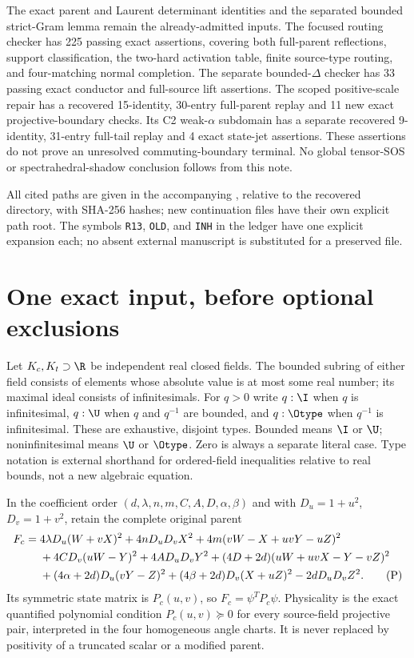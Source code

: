 The exact parent and Laurent determinant identities and the separated
bounded strict-Gram lemma remain the already-admitted inputs. The
focused routing checker has 225 passing exact assertions, covering both full-parent
reflections, support
classification, the two-hard activation table, finite source-type
routing, and four-matching normal completion. The separate bounded-$\Delta$
checker has 33 passing exact conductor and full-source lift assertions.
The scoped positive-scale repair has a recovered 15-identity, 30-entry
full-parent replay and 11 new exact projective-boundary checks.
Its C2 weak-$\alpha$ subdomain has a separate recovered 9-identity,
31-entry full-tail replay and 4 exact state-jet assertions.
These assertions do not
prove an unresolved commuting-boundary terminal. No global tensor-SOS
or spectrahedral-shadow conclusion follows from this note.

All cited paths are given in the accompanying ,
relative to the recovered  directory, with
SHA-256 hashes; new continuation files have their own explicit path root.
The symbols \texttt{R13}, \texttt{OLD}, and \texttt{INH}
in the ledger have one explicit expansion each; no absent external
manuscript is substituted for a preserved file.

\section{One exact input, before optional exclusions}

Let $K_c,K_t\supset\R$ be independent real closed fields. The bounded
subring of either field consists of elements whose absolute value is
at most some real number; its maximal ideal consists of infinitesimals.
For $q>0$ write $q:\I$ when $q$ is infinitesimal, $q:\U$ when $q$
and $q^{-1}$ are bounded, and $q:\Otype$ when $q^{-1}$ is infinitesimal.
These are exhaustive, disjoint types. Bounded means $\I$ or $\U$;
noninfinitesimal means $\U$ or $\Otype$. Zero is always a separate
literal case. Type notation is external shorthand for ordered-field
inequalities relative to real bounds, not a new algebraic equation.

In the coefficient order $(d,\lambda,n,m,C,A,D,\alpha,\beta)$ and
with $D_u=1+u^2$, $D_v=1+v^2$, retain the complete original parent
\begin{align}
F_c={}&4\lambda D_u(W+vX)^2+4nD_uD_vX^2
 +4m(vW-X+uvY-uZ)^2\notag\\
&+4CD_v(uW-Y)^2+4AD_uD_vY^2
 +(4D+2d)(uW+uvX-Y-vZ)^2\notag\\
&+(4\alpha+2d)D_u(vY-Z)^2
 +(4\beta+2d)D_v(X+uZ)^2-2dD_uD_vZ^2. \tag{P}
\end{align}
Its symmetric state matrix is $P_c(u,v)$, so $F_c=\psi^TP_c\psi$.
Physicality is the exact quantified polynomial condition
$P_c(u,v)\succeq0$ for every source-field projective pair, interpreted
in the four homogeneous angle charts. It is never replaced by
positivity of a truncated scalar or a modified parent.

